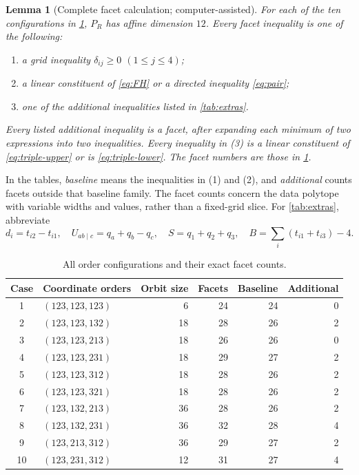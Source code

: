 \documentclass[a4paper,11pt]{amsart}
\numberwithin{equation}{section}
\newtheorem{lemma}[lemma]{Lemma}
\theoremstyle{definition}
\theoremstyle{remark}
\begin{document}
\begin{samepage}
\begin{lemma}[Complete facet calculation; computer-assisted]\label{lem:facets}
For each of the ten configurations in \cref{tab:counts}, $P_R$ has affine
dimension $12$. Every facet inequality is one of the following:
\begin{enumerate}
\item a grid inequality $\delta_{ij}\geq0$ $(1\leq j\leq4)$;
\item a linear constituent of \eqref{eq:FH} or a directed inequality
      \eqref{eq:pair};
\item one of the additional inequalities listed in \cref{tab:extras}.
\end{enumerate}
Every listed additional inequality is a facet, after expanding each
minimum of two expressions into two inequalities.
Every inequality in (3) is a linear constituent of
\eqref{eq:triple-upper} or is \eqref{eq:triple-lower}.
The facet numbers are those in \cref{tab:counts}.
\end{lemma}
\end{samepage}

In the tables, \emph{baseline} means the inequalities in (1) and (2),
and \emph{additional} counts facets outside that baseline family.
The facet counts concern the data polytope with variable widths and
values, rather than a fixed-grid slice.
For \cref{tab:extras}, abbreviate
\[
 d_i=t_{i2}-t_{i1},\quad
 U_{ab\mid c}=q_a+q_b-q_c,\quad S=q_1+q_2+q_3,
 \quad B=\sum_i(t_{i1}+t_{i3})-4.
\]

\begin{table}[htbp]
\centering\small
\caption{All order configurations and their exact facet counts.}
\label{tab:counts}
\begin{tabular}{clrrrr}
\toprule
Case & Coordinate orders & Orbit size & Facets & Baseline & Additional\\
\midrule
1 & $(123,123,123)$ & 6  & 24 & 24 & 0\\
2 & $(123,123,132)$ & 18 & 28 & 26 & 2\\
3 & $(123,123,213)$ & 18 & 26 & 26 & 0\\
4 & $(123,123,231)$ & 18 & 29 & 27 & 2\\
5 & $(123,123,312)$ & 18 & 28 & 26 & 2\\
6 & $(123,123,321)$ & 18 & 28 & 26 & 2\\
7 & $(123,132,213)$ & 36 & 28 & 26 & 2\\
8 & $(123,132,231)$ & 36 & 32 & 28 & 4\\
9 & $(123,213,312)$ & 36 & 29 & 27 & 2\\
10& $(123,231,312)$ & 12 & 31 & 27 & 4\\
\bottomrule
\end{tabular}
\end{table}
\end{document}
